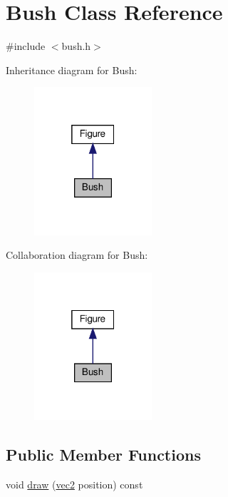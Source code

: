 \hypertarget{classBush}{}\section{Bush Class Reference}
\label{classBush}


{\ttfamily \#include $<$bush.\+h$>$}



Inheritance diagram for Bush\+:
\nopagebreak
\begin{figure}[H]
\begin{center}
\leavevmode
\includegraphics[width=124pt]{d3/d66/classBush__inherit__graph}
\end{center}
\end{figure}


Collaboration diagram for Bush\+:
\nopagebreak
\begin{figure}[H]
\begin{center}
\leavevmode
\includegraphics[width=124pt]{dd/d5d/classBush__coll__graph}
\end{center}
\end{figure}
\subsection*{Public Member Functions}
\begin{DoxyCompactItemize}
\item 
void \hyperlink{classBush_aa73b14744dbe2b868142dc2deae485ba}{draw} (\hyperlink{structvec2}{vec2} position) const
\end{DoxyCompactItemize}


